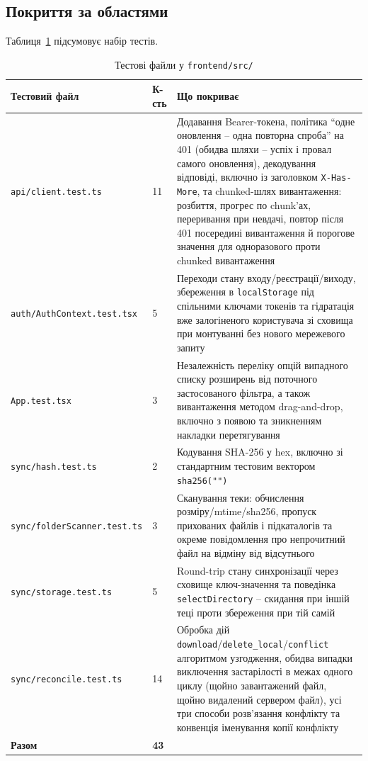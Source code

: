 \documentclass[12pt,a4paper]{article}
\begin{document}
\subsection{Покриття за областями}

Таблиця~\ref{tab:tests} підсумовує набір тестів.

\small
\begin{longtable}{@{}p{3.6cm}p{1.1cm}p{10.5cm}@{}}
\caption{Тестові файли у \texttt{frontend/src/}}
\label{tab:tests} \\
\toprule
\textbf{Тестовий файл} & \textbf{К-сть} & \textbf{Що покриває} \\
\midrule
\endhead
\texttt{api/\allowbreak client.test.ts} & 11 & Додавання Bearer-токена, політика ``одне оновлення -- одна повторна спроба'' на 401 (обидва шляхи -- успіх і провал самого оновлення), декодування відповіді, включно із заголовком \texttt{X-Has-More}, та chunked-шлях вивантаження: розбиття, прогрес по chunk'ах, переривання при невдачі, повтор після 401 посередині вивантаження й порогове значення для одноразового проти chunked вивантаження \\
\texttt{auth/\allowbreak AuthContext.\allowbreak test.tsx} & 5 & Переходи стану входу/реєстрації/виходу, збереження в \texttt{localStorage} під спільними ключами токенів та гідратація вже залогіненого користувача зі сховища при монтуванні без нового мережевого запиту \\
\texttt{App.test.tsx} & 3 & Незалежність переліку опцій випадного списку розширень від поточного застосованого фільтра, а також вивантаження методом drag-and-drop, включно з появою та зникненням накладки перетягування \\
\texttt{sync/\allowbreak hash.test.ts} & 2 & Кодування SHA-256 у hex, включно зі стандартним тестовим вектором \texttt{sha256("")} \\
\texttt{sync/\allowbreak folderScanner.\allowbreak test.ts} & 3 & Сканування теки: обчислення розміру/mtime/sha256, пропуск прихованих файлів і підкаталогів та окреме повідомлення про непрочитний файл на відміну від відсутнього \\
\texttt{sync/\allowbreak storage.test.ts} & 5 & Round-trip стану синхронізації через сховище ключ-значення та поведінка \texttt{selectDirectory} -- скидання при іншій теці проти збереження при тій самій \\
\texttt{sync/\allowbreak reconcile.\allowbreak test.ts} & 14 & Обробка дій \texttt{download}/\texttt{delete\_local}/\texttt{conflict} алгоритмом узгодження, обидва випадки виключення застарілості в межах одного циклу (щойно завантажений файл, щойно видалений сервером файл), усі три способи розв'язання конфлікту та конвенція іменування копії конфлікту \\
\bottomrule
\textbf{Разом} & \textbf{43} & \\
\end{longtable}
\end{document}
